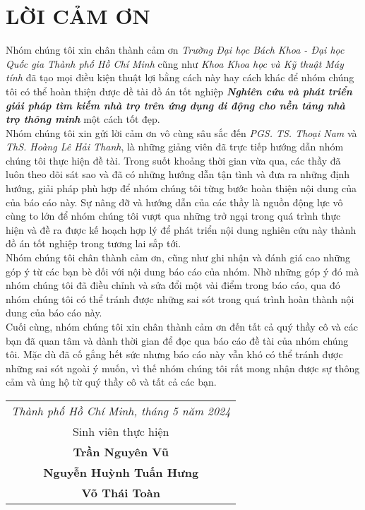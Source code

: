 \chapter*{LỜI CẢM ƠN}
\hspace*{1cm} Nhóm chúng tôi xin chân thành cảm ơn \textit{Trường Đại học Bách Khoa - Đại học Quốc gia Thành phố Hồ Chí Minh} cũng như \textit{Khoa Khoa học và Kỹ thuật Máy tính} đã tạo mọi điều kiện thuật lợi bằng cách này hay cách khác để nhóm chúng tôi có thể hoàn thiện được đề tài đồ án tốt nghiệp \textit{\textbf{Nghiên cứu và phát triển giải pháp tìm kiếm nhà trọ trên ứng dụng di động cho nền tảng nhà trọ thông minh}} một cách tốt đẹp.\\
\hspace*{1cm} Nhóm chúng tôi xin gửi lời cảm ơn vô cùng sâu sắc đến \textit{PGS. TS. Thoại Nam} và \textit{ThS. Hoàng Lê Hải Thanh}, là những giảng viên đã trực tiếp hướng dẫn nhóm chúng tôi thực hiện đề tài. Trong suốt khoảng thời gian vừa qua, các thầy đã luôn theo dõi sát sao và đã có những hướng dẫn tận tình và đưa ra những định hướng, giải pháp phù hợp để nhóm chúng tôi từng bước hoàn thiện nội dung của của báo cáo này. Sự nâng đỡ và hướng dẫn của các thầy là nguồn động lực vô cùng to lớn để nhóm chúng tôi vượt qua những trở ngại trong quá trình thực hiện và đề ra được kế hoạch hợp lý để phát triển nội dung nghiên cứu này thành đồ án tốt nghiệp trong tương lai sắp tới.\\
\hspace*{1cm} Nhóm chúng tôi chân thành cảm ơn, cũng như ghi nhận và đánh giá cao những góp ý từ các bạn bè đối với nội dung báo cáo của nhóm. Nhờ những góp ý đó mà nhóm chúng tôi đã điều chỉnh và sửa đổi một vài điểm trong báo cáo, qua đó nhóm chúng tôi có thể tránh được những sai sót trong quá trình hoàn thành nội dung của báo cáo này.\\
\hspace*{1cm} Cuối cùng, nhóm chúng tôi xin chân thành cảm ơn đến tất cả quý thầy cô và các bạn đã quan tâm và dành thời gian để đọc qua báo cáo đề tài của nhóm chúng tôi. Mặc dù đã cố gắng hết sức nhưng báo cáo này vẫn khó có thể tránh được những sai sót ngoài ý muốn, vì thế nhóm chúng tôi rất mong nhận được sự thông cảm và ủng hộ từ quý thầy cô và tất cả các bạn.\\
\begin{table}[h]
    \large
    \hspace{8cm}
    \begin{tabular}{c}
    \textit{Thành phố Hồ Chí Minh, tháng 5 năm 2024}\\
    Sinh viên thực hiện\\
    \bf Trần Nguyên Vũ \\
    \bf Nguyễn Huỳnh Tuấn Hưng \\
    \bf Võ Thái Toàn\\
    \end{tabular}
\end{table}